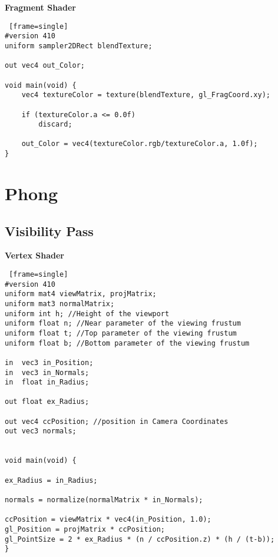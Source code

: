 \textbf{Fragment Shader}
\begin{lstlisting} [frame=single]
#version 410
uniform sampler2DRect blendTexture;

out vec4 out_Color;

void main(void) {
	vec4 textureColor = texture(blendTexture, gl_FragCoord.xy);

	if (textureColor.a <= 0.0f)
		discard;

	out_Color = vec4(textureColor.rgb/textureColor.a, 1.0f);
}
\end{lstlisting}
\newpage

\section{Phong \label{phong}}
\subsection{Visibility Pass}
\textbf{Vertex Shader}
\begin{lstlisting} [frame=single]
#version 410
uniform mat4 viewMatrix, projMatrix;
uniform mat3 normalMatrix;
uniform int h; //Height of the viewport
uniform float n; //Near parameter of the viewing frustum
uniform float t; //Top parameter of the viewing frustum
uniform float b; //Bottom parameter of the viewing frustum

in  vec3 in_Position;
in 	vec3 in_Normals;
in  float in_Radius;

out float ex_Radius;

out vec4 ccPosition; //position in Camera Coordinates
out vec3 normals;


void main(void) {

ex_Radius = in_Radius;

normals = normalize(normalMatrix * in_Normals);

ccPosition = viewMatrix * vec4(in_Position, 1.0);
gl_Position = projMatrix * ccPosition;
gl_PointSize = 2 * ex_Radius * (n / ccPosition.z) * (h / (t-b));
}
\end{lstlisting}
\newpage


